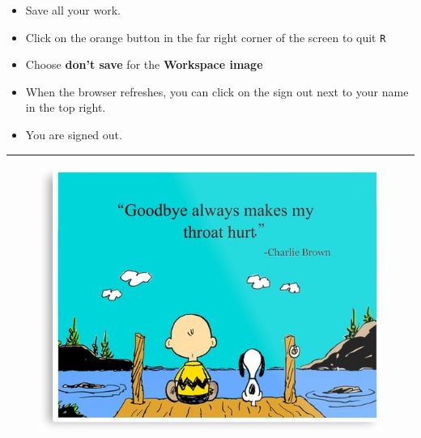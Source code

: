 \documentclass[
  letterpaper,
  DIV=11,
  numbers=noendperiod]{scrartcl}
\providecommand{\tightlist}{%
  \setlength{\itemsep}{0pt}\setlength{\parskip}{0pt}}\usepackage{longtable,booktabs,array}
\begin{document}
\begin{tcolorbox}[enhanced jigsaw, titlerule=0mm, toprule=.15mm, arc=.35mm, colbacktitle=quarto-callout-tip-color!10!white, coltitle=black, colframe=quarto-callout-tip-color-frame, left=2mm, breakable, bottomtitle=1mm, toptitle=1mm, bottomrule=.15mm, title=\textcolor{quarto-callout-tip-color}{\faLightbulb}\hspace{0.5em}{Tip}, colback=white, rightrule=.15mm, opacityback=0, opacitybacktitle=0.6, leftrule=.75mm]

\begin{itemize}
\tightlist
\item
  Save all your work.
\item
  Click on the orange button in the far right corner of the screen to
  quit \texttt{R}
\item
  Choose \textbf{don't save} for the \textbf{Workspace image}
\item
  When the browser refreshes, you can click on the sign out next to your
  name in the top right.
\item
  You are signed out.
\end{itemize}

\end{tcolorbox}

\begin{center}\rule{0.5\linewidth}{0.5pt}\end{center}

\begin{figure}

{\centering \includegraphics{PS01_source_files/mediabag/mp,550x550,gloss,fff.jpg}

}

\end{figure}
\end{document}
